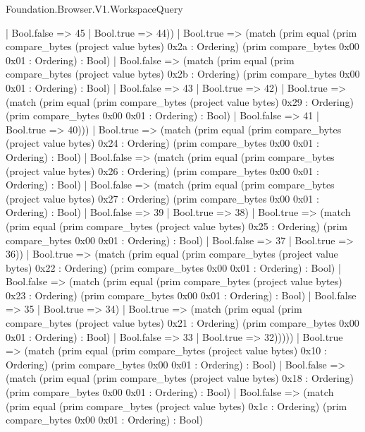\begin{lexlean}{Foundation.Browser.V1.WorkspaceQuery}
\begin{semanticmodule}
{                    | Bool.false => 45
                    | Bool.true => 44))
                | Bool.true => (match (prim equal (prim compare_bytes (project value bytes) 0x2a : Ordering) (prim compare_bytes 0x00 0x01 : Ordering) : Bool)
                  | Bool.false => (match (prim equal (prim compare_bytes (project value bytes) 0x2b : Ordering) (prim compare_bytes 0x00 0x01 : Ordering) : Bool)
                    | Bool.false => 43
                    | Bool.true => 42)
                  | Bool.true => (match (prim equal (prim compare_bytes (project value bytes) 0x29 : Ordering) (prim compare_bytes 0x00 0x01 : Ordering) : Bool)
                    | Bool.false => 41
                    | Bool.true => 40)))
              | Bool.true => (match (prim equal (prim compare_bytes (project value bytes) 0x24 : Ordering) (prim compare_bytes 0x00 0x01 : Ordering) : Bool)
                | Bool.false => (match (prim equal (prim compare_bytes (project value bytes) 0x26 : Ordering) (prim compare_bytes 0x00 0x01 : Ordering) : Bool)
                  | Bool.false => (match (prim equal (prim compare_bytes (project value bytes) 0x27 : Ordering) (prim compare_bytes 0x00 0x01 : Ordering) : Bool)
                    | Bool.false => 39
                    | Bool.true => 38)
                  | Bool.true => (match (prim equal (prim compare_bytes (project value bytes) 0x25 : Ordering) (prim compare_bytes 0x00 0x01 : Ordering) : Bool)
                    | Bool.false => 37
                    | Bool.true => 36))
                | Bool.true => (match (prim equal (prim compare_bytes (project value bytes) 0x22 : Ordering) (prim compare_bytes 0x00 0x01 : Ordering) : Bool)
                  | Bool.false => (match (prim equal (prim compare_bytes (project value bytes) 0x23 : Ordering) (prim compare_bytes 0x00 0x01 : Ordering) : Bool)
                    | Bool.false => 35
                    | Bool.true => 34)
                  | Bool.true => (match (prim equal (prim compare_bytes (project value bytes) 0x21 : Ordering) (prim compare_bytes 0x00 0x01 : Ordering) : Bool)
                    | Bool.false => 33
                    | Bool.true => 32)))))
          | Bool.true => (match (prim equal (prim compare_bytes (project value bytes) 0x10 : Ordering) (prim compare_bytes 0x00 0x01 : Ordering) : Bool)
            | Bool.false => (match (prim equal (prim compare_bytes (project value bytes) 0x18 : Ordering) (prim compare_bytes 0x00 0x01 : Ordering) : Bool)
              | Bool.false => (match (prim equal (prim compare_bytes (project value bytes) 0x1c : Ordering) (prim compare_bytes 0x00 0x01 : Ordering) : Bool)
}
\end{semanticmodule}
\end{lexlean}
